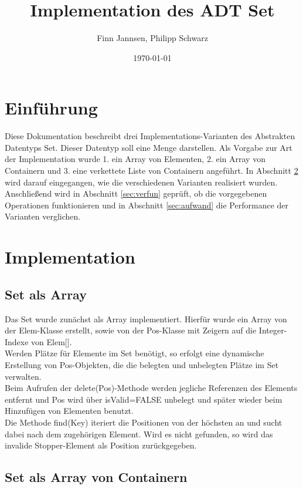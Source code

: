\documentclass[11pt]{scrartcl}
\title{Implementation des ADT Set}
\author{Finn Jannsen, Philipp Schwarz}
\date{\today{}}
\begin{document}
\maketitle

\tableofcontents

\section{Einführung}
\label{sec:einfuehrung}

Diese Dokumentation beschreibt drei Implementations-Varianten des Abstrakten Datentyps Set. Dieser Datentyp soll eine Menge darstellen.
Als Vorgabe zur Art der Implementation wurde 1. ein Array von Elementen, 2. ein Array von Containern und 3. eine verkettete Liste von Containern angeführt.
In Abschnitt \ref{sec:implementation} wird darauf eingegangen, wie die verschiedenen Varianten realisiert wurden.
Anschließend wird in Abschnitt \ref{sec:verfun} geprüft, ob die vorgegebenen Operationen funktionieren und in Abschnitt \ref{sec:aufwand} die Performance der Varianten verglichen.

\section{Implementation}
\label{sec:implementation}
\subsection{Set als Array}
\label{sec:setArray}

Das Set wurde zunächst als Array implementiert. Hierfür wurde ein Array von der Elem-Klasse erstellt, sowie von der Pos-Klasse mit Zeigern auf die Integer-Indexe von Elem[].\\
Werden Plätze für Elemente im Set benötigt, so erfolgt eine dynamische Erstellung von Pos-Objekten, die die belegten und unbelegten Plätze im Set verwalten.\\
Beim Aufrufen der delete(Pos)-Methode werden jegliche Referenzen des Elements entfernt und Pos wird über isValid=FALSE unbelegt und später wieder beim Hinzufügen von Elementen benutzt.\\
Die Methode find(Key) iteriert die Positionen von der höchsten an und sucht dabei nach dem zugehörigen Element. Wird es nicht gefunden, so wird das invalide Stopper-Element als Position zurückgegeben.\\

\subsection{Set als Array von Containern}
\label{sec:setConArray}
\end{document}
